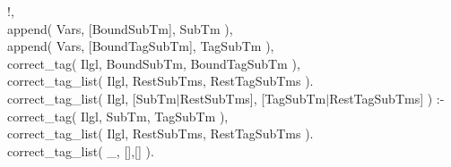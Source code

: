 \documentclass[11pt]{report}
\begin{document}
\begin{sf}
\begin{tabbing}
\hspace{2em}!,\\[-0.15ex]
\hspace{2em}append( Vars, [BoundSubTm], SubTm ),\\[-0.15ex]
\hspace{2em}append( Vars, [BoundTagSubTm], TagSubTm ),\\[-0.15ex]
\hspace{2em}correct\_\hspace{0.1em}tag( Ilgl, BoundSubTm, BoundTagSubTm ),\\[-0.15ex]
\hspace{2em}correct\_\hspace{0.1em}tag\_\hspace{0.1em}list( Ilgl, RestSubTms, RestTagSubTms ).\\[-0.15ex]
correct\_\hspace{0.1em}tag\_\hspace{0.1em}list( Ilgl, [SubTm$\mid$RestSubTms], [TagSubTm$\mid$RestTagSubTms] ) :-\\[-0.15ex]
\hspace{2em}correct\_\hspace{0.1em}tag( Ilgl, SubTm, TagSubTm ),\\[-0.15ex]
\hspace{2em}correct\_\hspace{0.1em}tag\_\hspace{0.1em}list( Ilgl, RestSubTms, RestTagSubTms ).\\[-0.15ex]
correct\_\hspace{0.1em}tag\_\hspace{0.1em}list( \_\hspace{0.1em}, [],[] ).\\[-0.7ex]

\end{tabbing}\end{sf}
\end{document}
